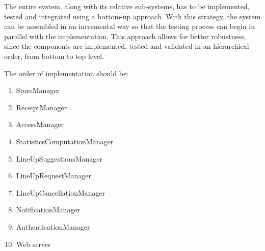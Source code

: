 \documentclass[../../main.tex]{subfiles}
\begin{document}
The entire system, along with its relative sub-systems, has to be implemented, tested and integrated using a bottom-up approach. 
With this strategy, the system can be assembled in an incremental way so that the testing process can begin in parallel with the implementation. 
This approach allows for better robustness, since the components are implemented, tested and validated in an hierarchical order, from bottom to top level.


The order of implementation should be:

\begin{enumerate}

	\item StoreManager
	\item ReceiptManager
	\item AccessManager
	\item StatisticsComputationManager
	\item LineUpSuggestionsManager
	\item LineUpRequestManager
	\item LineUpCancellationManager
	\item NotificationManager
	\item AuthenticationManager
	\item Web server

\end{enumerate}

\end{document}
